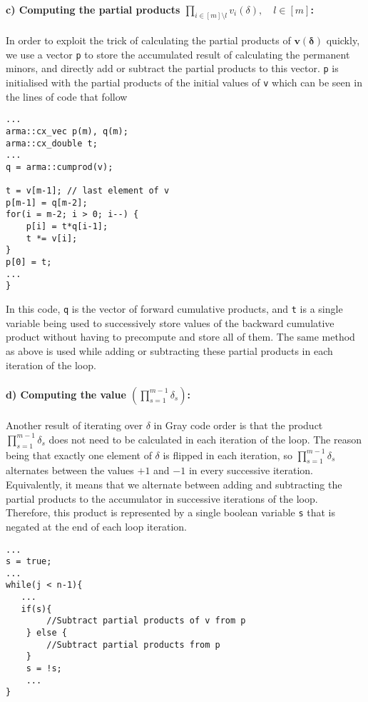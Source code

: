 \documentclass[11pt]{article}
\theoremstyle{theorem}
\theoremstyle{theorem}
\theoremstyle{remark}
\theoremstyle{note}
\theoremstyle{plain}
\theoremstyle{definition}
\begin{document}
\paragraph{c) Computing the partial products $\prod_{i \in [m] \setminus l} v_i (\delta), \quad l \in [m]$:} In order to exploit the trick of calculating the partial products of $\mathbf{v}(\mathbf{\delta})$ quickly, we use a vector \texttt{p} to store the accumulated result of calculating the permanent minors, and directly add or subtract the partial products to this vector. \texttt{p} is initialised with the partial products of the initial values of \texttt{v} which can be seen in the lines of code that follow
\begin{verbatim}
...
arma::cx_vec p(m), q(m);
arma::cx_double t;
...
q = arma::cumprod(v);

t = v[m-1];	// last element of v
p[m-1] = q[m-2];
for(i = m-2; i > 0; i--) {
    p[i] = t*q[i-1];
    t *= v[i];
}
p[0] = t;
...
}
\end{verbatim}
In this code, \texttt{q} is the vector of forward cumulative products, and  \texttt{t} is a single variable being used to successively store values of the backward cumulative product without having to precompute and store all of them. The same method as above is used while adding or subtracting these partial products in each iteration of the loop.

\paragraph{d) Computing the value $\left( \prod_{s=1}^{m-1} \delta_s \right)$:} Another result of iterating over $\delta$ in Gray code order is that the product $\prod_{s=1}^{m-1} \delta_s$ does not need to be calculated in each iteration of the loop. The reason being that exactly one element of $\delta$ is flipped in each iteration, so $\prod_{s=1}^{m-1} \delta_s$ alternates between the values $+1$ and $-1$ in every successive iteration. Equivalently, it means that we alternate between adding and subtracting the partial products to the accumulator in successive iterations of the loop. Therefore, this product is represented by a single boolean variable \texttt{s} that is negated at the end of each loop iteration. %
\begin{verbatim}
...
s = true;
...
while(j < n-1){
   ...
   if(s){
        //Subtract partial products of v from p
    } else {
        //Subtract partial products from p
    }
    s = !s;
    ...
}
\end{verbatim}
\end{document}
